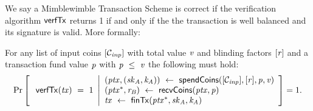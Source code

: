 We say a Mimblewimble Transaction Scheme is correct if the verification algorithm $\mathsf{verfTx}$ returns 1 if and only if the the transaction is well
balanced and its signature is valid. More formally:
\begin{definition}
    \label{def:tx-scheme-correctness}
    For any list of input coins $[\mathcal{C}_{\mathit{inp}}]$ with total value $\mathit{v}$ and blinding factors
    $[\mathit{r}]$ and a transaction fund value $\mathit{p}$ with $\mathit{p} ~\leq~ \mathit{v}$ the following must hold:
    \[
        \Pr\left[
        \begin{array}{c}
            \: \mathsf{verfTx}(\mathit{tx}) ~=~ 1
        \end{array}
        \middle\vert
        \begin{array}{l}
            (\mathit{ptx}, (\mathit{sk}_{\mathit{A}}, \mathit{\mathit{k}_{\mathit{A}}})) ~\leftarrow~ \mathsf{spendCoins}([\mathcal{C}_{\mathit{inp}}],[\mathit{r}],\mathit{p},\mathit{v}) \\
            (\mathit{ptx}^*, \mathit{r}_{\mathit{B}}) ~\leftarrow~ \mathsf{recvCoins}(\mathit{ptx},\mathit{p})                                                          \\
            \mathit{tx} ~\leftarrow~ \mathsf{finTx}(\mathit{ptx}^*,\mathit{sk}_{\mathit{A}},\mathit{\mathit{k}_{\mathit{A}}})
        \end{array}
        \right]=1.
    \]
\end{definition}

